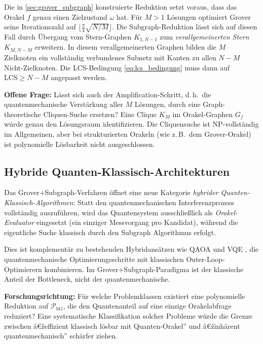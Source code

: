 ﻿\documentclass[11pt,a4paper]{article}
\theoremstyle{definition}
\begin{document}
Die in \cref{sec:grover_subgraph} konstruierte Reduktion setzt voraus, dass
das Orakel $f$ genau einen Zielzustand $\omega$ hat.  Für $M > 1$ Lösungen
optimiert Grover seine Iterationszahl auf $\lfloor\tfrac{\pi}{4}\sqrt{N/M}\rfloor$.
Die Subgraph-Reduktion lässt sich auf diesen Fall durch Übergang vom Stern-Graphen
$K_{1,N-1}$ zum \emph{verallgemeinerten Stern} $K_{M,N-M}$ erweitern.
In diesem verallgemeinerten Graphen bilden die $M$ Zielknoten ein vollständig
verbundenes Subnetz mit Kanten zu allen $N-M$ Nicht-Zielknoten.  Die
LCS-Bedingung \eqref{eq:lcs_bedingung} muss dann auf
$\mathrm{LCS} \geq N-M$ angepasst werden.

\textbf{Offene Frage:}  Lässt sich auch der Amplification-Schritt, d.\,h.\ die
quantenmechanische Verstärkung aller $M$ Lösungen, durch eine Graph-theoretische
Cliquen-Suche ersetzen?  Eine Clique $K_M$ im Orakel-Graphen $G_f$ würde genau
den Lösungsraum identifizieren.  Die Cliquensuche ist NP-vollständig im
Allgemeinen, aber bei strukturierten Orakeln (wie z.\,B.\ dem Grover-Orakel)
ist polynomielle Lösbarkeit nicht ausgeschlossen.

\subsection{Hybride Quanten-Klassisch-Architekturen}
\label{subsec:outlook_hybrid}

Das Grover+Subgraph-Verfahren öffnet eine neue Kategorie
\emph{hybrider Quanten-Klassisch-Algorith\-men}:  Statt den quantenmechanischen
Interferenzprozess vollständig auszuführen, wird das Quantensystem ausschließlich
als \emph{Orakel-Evaluator} eingesetzt (ein einziger Messvorgang pro Kandidat),
während die eigentliche Suche klassisch durch den Subgraph Algorithmus erfolgt.

Dies ist komplementär zu bestehenden Hybridansätzen wie QAOA \cite{Farhi2014}
und VQE \cite{Peruzzo2014}, die quantenmechanische Optimierungsschritte
mit klassischen Outer-Loop-Optimierern kombinieren.  Im Grover+Subgraph-Paradigma
ist der klassische Anteil der Bottleneck, nicht der quantenmechanische.

\textbf{Forschungsrichtung:}  Für welche Problemklassen existiert eine
polynomielle Reduktion auf $\mathcal{P}_{\mathrm{SG}}$, die den Quantenanteil
auf eine einzige Orakelabfrage reduziert?  Eine systematische Klassifikation
solcher Probleme würde die Grenze zwischen â€žeffizient klassisch lösbar mit
Quanten-Orakel'' und â€žinhärent quantenmechanisch'' schärfer ziehen.
\end{document}
